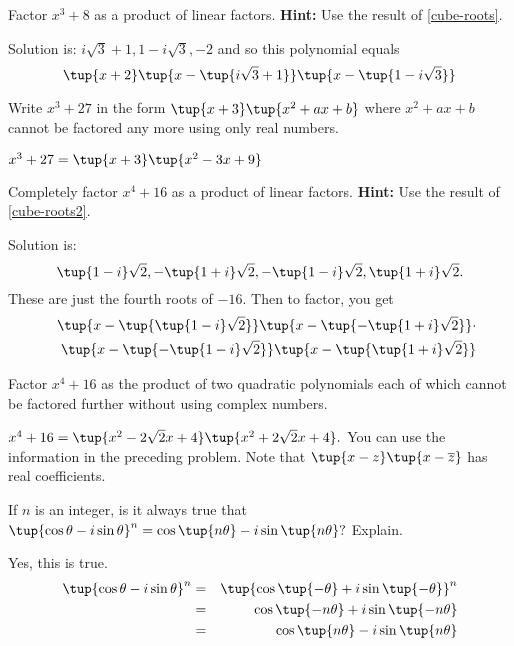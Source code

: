\begin{enumialphparenastyle}
\begin{ex} Factor $x^{3}+8$ as a product of linear factors. \textbf{Hint:} Use the result of \ref{cube-roots}.
\begin{sol}
Solution
is: $i\sqrt{3}+1,1-i\sqrt{3},-2$ and so this polynomial equals
\[
\tup{x+2} \tup{x-\tup{i\sqrt{3}+1} } \tup{x-\tup{
1-i\sqrt{3}} }
\]
\end{sol}
\end{ex}

\begin{ex} Write $x^{3}+27$ in the form $\tup{x+3} \tup{
x^{2}+ax+b} $ where $x^{2}+ax+b$ cannot be factored any more using
only real numbers. 
\begin{sol}
$x^{3}+27= \tup{x+3} \tup{
x^{2}-3x+9} $
\end{sol}
\end{ex}

\begin{ex} Completely factor $x^{4}+16$ as a product of linear factors. \textbf{Hint:} Use the result of \ref{cube-roots2}. 
\begin{sol}
Solution is:
\[
\tup{1-i} \sqrt{2},-\tup{1+i} \sqrt{2},-\tup{1-i}
\sqrt{2},\tup{1+i} \sqrt{2}.
\]
These are just the fourth roots of $-16$. Then to factor, you get
\begin{eqnarray*}
&&\tup{x-\tup{\tup{1-i} \sqrt{2}} } \tup{x-\tup{
-\tup{1+i} \sqrt{2}} } \cdot \\
&&\tup{x-\tup{-\tup{1-i} \sqrt{2}} } \tup{x-\tup{
\tup{1+i} \allowbreak \sqrt{2}} }
\end{eqnarray*}
\end{sol}
\end{ex}


\begin{ex} Factor $x^{4}+16$ as the product of two quadratic polynomials each of
which cannot be factored further without using complex numbers. 
\begin{sol}
$x^{4}+16=\tup{x^{2}-2\sqrt{2}x+4} \tup{x^{2}+2\sqrt{2}x+4} .
$ You can use the information in the preceding problem. Note that $\tup{
x-z} \tup{x-\overline{z}} $ has real coefficients.
\end{sol}
\end{ex}

\begin{ex} If $n$ is an integer, is it always true that $\tup{\cos \theta
-i\sin \theta } ^{n}=\cos \tup{n\theta } -i\sin \tup{n\theta
} ?$ Explain.
\begin{sol}
Yes, this is true.
\begin{eqnarray*}
\tup{\cos \theta -i\sin \theta } ^{n} &=&\tup{\cos \tup{-\theta
} +i\sin \tup{-\theta } } ^{n} \\
&=&\cos \tup{-n\theta } +i\sin \tup{-n\theta } \\
&=&\cos \tup{n\theta } -i\sin \tup{n\theta }
\end{eqnarray*}
\end{sol}
\end{ex}



\end{enumialphparenastyle}
